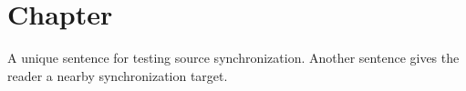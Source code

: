 \section{Chapter}\label{chapter}
A unique sentence for testing source synchronization.
Another sentence gives the reader a nearby synchronization target.
